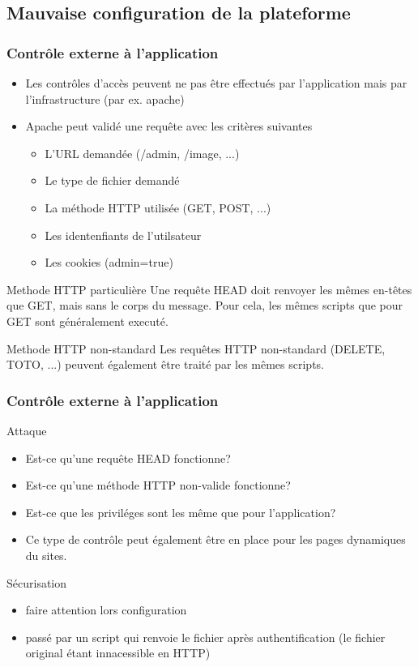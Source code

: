 \documentclass{beamer}
\begin{document}
\subsection{Mauvaise configuration de la plateforme}
\begin{frame}
  \frametitle{Contrôle externe à l'application}
  \begin{itemize}
    \item Les contrôles d'accès peuvent ne pas être effectués par l'application mais par l'infrastructure (par ex. apache)
    \item Apache peut validé une requête avec les critères suivantes
    \begin{itemize}
      \item L'URL demandée (/admin, /image, ...)
      \item Le type de fichier demandé
      \item La méthode HTTP utilisée (GET, POST, ...)
      \item Les identenfiants de l'utilsateur
      \item Les cookies (admin=true)
    \end{itemize}
  \end{itemize}
  \begin{block}{Methode HTTP particulière}
    Une requête HEAD doit renvoyer les mêmes en-têtes que GET, mais sans le corps du message. Pour cela, les mêmes scripts que pour GET sont généralement executé.
  \end{block}
  \begin{block}{Methode HTTP non-standard}
    Les requêtes HTTP non-standard (DELETE, TOTO, ...) peuvent également être traité par les mêmes scripts.
  \end{block}
\end{frame}
\begin{frame}
  \frametitle{Contrôle externe à l'application}
  \begin{alertblock}{Attaque}
    \begin{itemize}
      \item Est-ce qu'une requête HEAD fonctionne?
      \item Est-ce qu'une méthode HTTP non-valide fonctionne?
      \item Est-ce que les priviléges sont les même que pour l'application?
      \item Ce type de contrôle peut également être en place pour les pages dynamiques du sites.
    \end{itemize}
  \end{alertblock}
  \begin{exampleblock}{Sécurisation}
    \begin{itemize}
      \item faire attention lors configuration
      \item passé par un script qui renvoie le fichier après authentification (le fichier original étant innacessible en HTTP)
    \end{itemize}
  \end{exampleblock}
\end{frame}
\end{document}
